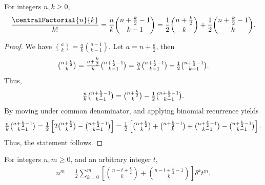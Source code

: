 \begin{lemma}
  \label{lem:central-factorials-binomial-form-decomposition}
  For integers $n,k\geq 0$,
  \begin{align*}
    \frac{\centralFactorial{n}{k}}{k!}
    = \frac{n}{k} \binom{n+\frac{k}{2}-1}{k-1}
    = \frac{1}{2} \binom{n+\frac{k}{2}}{k} + \frac{1}{2} \binom{n+\frac{k}{2}-1}{k}.
  \end{align*}
  \begin{proof}
    We have $\binom{a}{k} = \frac{a}{k} \binom{a-1}{k-1}$.
    Let $a=n + \frac{k}{2}$, then
    \begin{align*}
      \tbinom{n + \frac{k}{2}}{k} = \tfrac{n + \tfrac{k}{2}}{k} \tbinom{n+\frac{k}{2}-1}{k-1}
      = \tfrac{n}{k} \tbinom{n+\frac{k}{2}-1}{k-1} + \tfrac{1}{2} \tbinom{n+\frac{k}{2}-1}{k-1}.
    \end{align*}
    Thus,
    \begin{align*}
      \tfrac{n}{k} \tbinom{n+\frac{k}{2}-1}{k-1} = \tbinom{n + \frac{k}{2}}{k} - \tfrac{1}{2} \tbinom{n+\frac{k}{2}-1}{k-1}.
    \end{align*}
    By moving under common denominator, and applying binomial recurrence yields
    \begin{align*}
      \tfrac{n}{k} \tbinom{n+\frac{k}{2}-1}{k-1}
      = \tfrac{1}{2}
      \left[
        2 \tbinom{n + \frac{k}{2}}{k} - \tbinom{n+\frac{k}{2}-1}{k-1}
      \right]
      = \tfrac{1}{2}
      \left[
        \tbinom{n + \frac{k}{2}}{k} + \tbinom{n + \frac{k}{2}-1}{k} + \tbinom{n + \frac{k}{2}-1}{k-1} - \tbinom{n+\frac{k}{2}-1}{k-1}
      \right].
    \end{align*}
    Thus, the statement follows.
  \end{proof}
\end{lemma}

\begin{lemma}
  \label{lem:central-newtons-formula-for-powers-decomposition}
  For integers $n,m \geq 0$, and an arbitrary integer $t$,
  \begin{align*}
    n^m = \frac{1}{2} \sum_{k=0}^{m}
    \left[
      \binom{n-t+\frac{k}{2}}{k} + \binom{n-t+\frac{k}{2}-1}{k}
    \right] \delta^{k} t^m.
  \end{align*}
\end{lemma}


